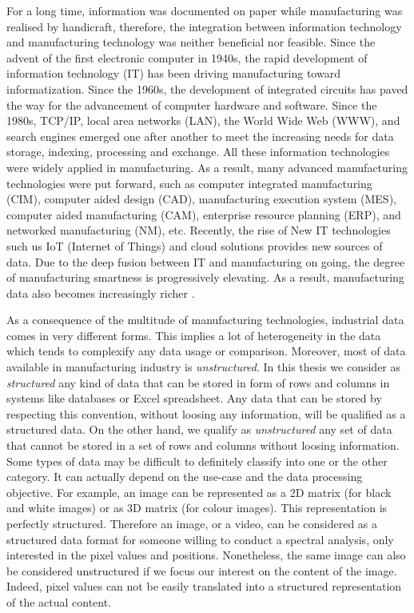 For a long time, information was documented on paper while manufacturing was realised by handicraft, therefore, the integration between information technology and manufacturing technology was neither beneficial nor feasible. Since the advent of the first electronic computer in 1940s, the rapid development of information technology (IT) has been driving manufacturing toward informatization. Since the 1960s, the development of integrated circuits has paved the way for the advancement of computer hardware and software. Since the 1980s, TCP/IP, local area networks (LAN), the World Wide Web (WWW), and search engines emerged one after another to meet the increasing needs for data storage, indexing, processing and exchange. All these information technologies were widely applied in manufacturing. As a result, many advanced manufacturing technologies were put forward, such as computer integrated manufacturing (CIM), computer aided design (CAD), manufacturing execution system (MES), computer aided manufacturing (CAM), enterprise resource planning (ERP), and networked manufacturing (NM), etc. Recently, the rise of New IT technologies such us IoT (Internet of Things) and cloud solutions provides new sources of data. Due to the deep fusion between IT and manufacturing on going, the degree of manufacturing smartness is progressively elevating. As a result, manufacturing data also becomes increasingly richer \citep{tao2018data}.

As a consequence of the multitude of manufacturing technologies, industrial data comes in very different forms. This implies a lot of heterogeneity in the data which tends to complexify any data usage or comparison. Moreover, most of data available in manufacturing industry is \textit{unstructured}. In this thesis we consider as \textit{structured} any kind of data that can be stored in form of rows and columns in systems like databases or Excel spreadsheet. Any data that can be stored by respecting this convention, without loosing any information, will be qualified as a structured data. On the other hand, we qualify as \textit{unstructured} any set of data that cannot be stored in a set of rows and columns without loosing information. Some types of data may be difficult to definitely classify into one or the other category. It can actually depend on the use-case and the data processing objective. For example, an image can be represented as a 2D matrix (for black and white images) or as 3D matrix (for colour images). This representation is perfectly structured. Therefore an image, or a video, can be considered as a structured data format for someone willing to conduct a spectral analysis, only interested in the pixel values and positions. Nonetheless, the same image can also be considered unstructured if we focus our interest on the content of the image. Indeed, pixel values can not be easily translated into a structured representation of the actual content.

